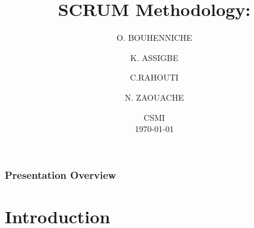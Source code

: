 \documentclass[
	11pt, %
]{beamer}
\title[Scrum Methodology]{\textbf{SCRUM Methodology:} \\ \text{Team\_SCRUM}} %
\author[BOUHENNICHE,\and ASSIGBE,\and RAHOUTI,\and ZAOUACHE]{O. BOUHENNICHE \and K. ASSIGBE \and C.RAHOUTI \and N. ZAOUACHE} %
\institute[]{University of Strasbourg } %
\date[\today]{ CSMI \\ \today} %
\begin{document}

\begin{frame}
	\titlepage %
\end{frame}



\begin{frame}
	\frametitle{Presentation Overview} %

	\tableofcontents %
\end{frame}


\section{Introduction} %
\end{document}
